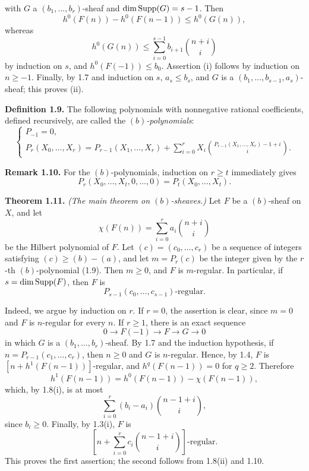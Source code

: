 \newpage
with \(G\) a \((b_1,\ldots,b_r)\)-sheaf and
\(\dim\operatorname{Supp}(G)=s-1\). Then
\[
  h^0(F(n))-h^0(F(n-1))\leq h^0(G(n)),
\]
whereas
\[
  h^0(G(n))\leq
  \sum_{i=0}^{s-1}b_{i+1}\binom{n+i}{i}
\]
by induction on \(s\), and \(h^0(F(-1))\leq b_0\). Assertion (i) follows
by induction on \(n\geq-1\). Finally, by 1.7 and induction on \(s\),
\(a_s\leq b_s\), and \(G\) is a
\((b_1,\ldots,b_{s-1},a_s)\)-sheaf; this proves (ii).

\textbf{Definition 1.9.} The following polynomials with nonnegative rational
coefficients, defined recursively, are called the \emph{\((b)\)-polynomials}:
\[
\begin{cases}
P_{-1}=0,\\
P_r(X_0,\ldots,X_r)=P_{r-1}(X_1,\ldots,X_r)
+\displaystyle\sum_{i=0}^{r}X_i
\binom{P_{r-1}(X_1,\ldots,X_r)-1+i}{i}.
\end{cases}
\]

\textbf{Remark 1.10.} For the \((b)\)-polynomials, induction on \(r\geq t\)
immediately gives
\[
  P_r(X_0,\ldots,X_t,0,\ldots,0)=P_t(X_0,\ldots,X_t).
\]

\textbf{Theorem 1.11.} \emph{(The main theorem on \((b)\)-sheaves.)} Let
\(F\) be a \((b)\)-sheaf on \(X\), and let
\[
  \chi(F(n))=\sum_{i=0}^{r}a_i\binom{n+i}{i}
\]
be the Hilbert polynomial of \(F\). Let
\((c)=(c_0,\ldots,c_r)\) be a sequence of integers satisfying
\((c)\geq(b)-(a)\), and let \(m=P_r(c)\) be the integer given by the
\(r\)-th \((b)\)-polynomial (1.9). Then \(m\geq0\), and \(F\) is
\(m\)-regular. In particular, if \(s=\dim\operatorname{Supp}(F)\), then \(F\) is
\[
  P_{s-1}(c_0,\ldots,c_{s-1})\text{-regular}.
\]

\newpage
Indeed, we argue by induction on \(r\). If \(r=0\), the assertion is clear,
since \(m=0\) and \(F\) is \(n\)-regular for every \(n\). If \(r\geq1\),
there is an exact sequence
\[
  0\longrightarrow F(-1)\longrightarrow F\longrightarrow G\longrightarrow0
\]
in which \(G\) is a \((b_1,\ldots,b_r)\)-sheaf. By 1.7 and the induction
hypothesis, if \(n=P_{r-1}(c_1,\ldots,c_r)\), then \(n\geq0\) and \(G\) is
\(n\)-regular. Hence, by 1.4, \(F\) is
\([n+h^1(F(n-1))]\)-regular, and \(h^q(F(n-1))=0\) for \(q\geq2\).
Therefore
\[
  h^1(F(n-1))=h^0(F(n-1))-\chi(F(n-1)),
\]
which, by 1.8(i), is at most
\[
  \sum_{i=0}^{r}(b_i-a_i)\binom{n-1+i}{i},
\]
since \(b_i\geq0\). Finally, by 1.3(i), \(F\) is
\[
  \left[n+\sum_{i=0}^{r}c_i\binom{n-1+i}{i}\right]\text{-regular}.
\]
This proves the first assertion; the second follows from 1.8(ii) and 1.10.

